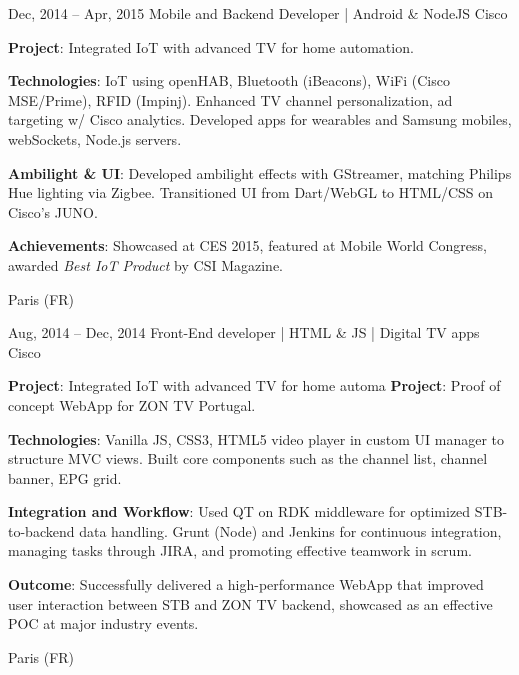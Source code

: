 \documentclass[
  a4paper,
   maincolor=cvblue,
   sectioncolor=cvblue,
   sidebarwidth=0.323\paperwidth,
]{fortysecondscv}
\begin{document}
\begin{cvtableNew}
  \cvitemRightNew
    {Dec, 2014 – Apr, 2015} %
    {Mobile and Backend Developer | Android \& NodeJS} %
    {Cisco} %
    {
      \vspace{1pt} %
      \fontsize{10.8pt}{12pt}\selectfont %
      \textbf{Project}: Integrated IoT with advanced TV for home automation.\par
      \vspace{4pt}
      \textbf{Technologies}: IoT using openHAB, Bluetooth (iBeacons), WiFi (Cisco MSE/Prime), RFID (Impinj). Enhanced TV channel personalization, ad targeting w/ Cisco analytics. Developed apps for wearables and Samsung mobiles, webSockets, Node.js servers.\par
      \vspace{4pt}
      \textbf{Ambilight \& UI}: Developed ambilight effects with GStreamer, matching Philips Hue lighting via Zigbee. Transitioned UI from Dart/WebGL to HTML/CSS on Cisco’s JUNO.\par
      \vspace{4pt}
      \textbf{Achievements}: Showcased at CES 2015, featured at Mobile World Congress, awarded \textit{Best IoT Product} by CSI Magazine.\par
      \vspace{4pt} %
    }
    {Paris (FR)} %

    \vspace{1.16mm} %

    \cvitemRightNew
    {Aug, 2014 – Dec, 2014} %
    {Front-End developer | HTML \& JS | Digital TV apps} %
    {Cisco} %
    {
      \vspace{1pt} %
      \fontsize{10.8pt}{12pt}\selectfont %
      \textbf{Project}: Integrated IoT with advanced TV for home automa
      \textbf{Project}: Proof of concept WebApp for ZON TV Portugal.\par
      \vspace{4pt}
      \textbf{Technologies}: Vanilla JS, CSS3, HTML5 video player in custom UI manager to structure MVC views. Built core components such as the channel list, channel banner, EPG grid.\par
      \vspace{4pt}
      \textbf{Integration and Workflow}: Used QT on RDK middleware for optimized STB-to-backend data handling. Grunt (Node) and Jenkins for continuous integration, managing tasks through JIRA, and promoting effective teamwork in scrum.\par
      \vspace{4pt}
      \textbf{Outcome}: Successfully delivered a high-performance WebApp that improved user interaction between STB and ZON TV backend, showcased as an effective POC at major industry events.
    }
    {Paris (FR)} %
\end{cvtableNew}
\end{document}
